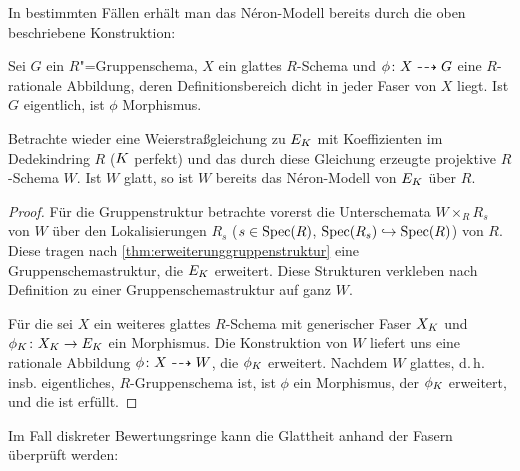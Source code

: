 \documentclass[german]{scrreprt}
\begin{document}
In bestimmten Fällen erhält man das Néron-Modell bereits durch die
oben beschriebene Konstruktion:
\begin{Lemma}\label{thm:rationalzumorphismus}
  Sei $G$ ein $R$"=Gruppenschema, $X$ ein glattes $R$-Schema und
  $\phi\colon X\dashrightarrow G$ eine $R$-rationale Abbildung, deren
  Definitionsbereich dicht in jeder Faser von $X$ liegt.
  Ist $G$ eigentlich, ist $\phi$ Morphismus.
  \cite[Proposition IV.6.2]{silverman2}
\end{Lemma}
\begin{Korollar}\label{thm:neronmausweierstrassgl}
  Betrachte wieder eine Weierstraßgleichung zu $E_{K}$ mit
  Koeffizienten im Dedekindring $R$ ($K$ perfekt) und das durch diese
  Gleichung erzeugte projektive $R$-Schema $W$.
  Ist $W$ glatt, so ist $W$ bereits das Néron-Modell von $E_{K}$ über
  $R$.
  \cite[Corollary IV.6.3]{silverman2}
  \begin{proof}
    Für die Gruppenstruktur betrachte vorerst die Unterschemata
    $W\times_R R_s$ von $W$ über den Lokalisierungen
    $R_s$ ($s\in\operatorname{Spec}(R)$, $\operatorname{Spec}(R_s)\hookrightarrow\operatorname{Spec}(R)$) von $R$.
    Diese tragen nach \autoref{thm:erweiterunggruppenstruktur} eine
    Gruppenschemastruktur, die $E_{K}$ erweitert.
    Diese Strukturen verkleben nach Definition zu einer
    Gruppenschemastruktur auf ganz $W$.

    Für die \NAbbEig sei $X$ ein weiteres glattes $R$-Schema mit
    generischer Faser $X_{K}$ und $\phi_{K}\colon X_{K}\to E_{K}$ ein
    Morphismus.
    Die Konstruktion von $W$ liefert uns eine rationale Abbildung
    $\phi\colon X\dashrightarrow W$, die $\phi_{K}$ erweitert.
    Nachdem $W$ glattes, d.\,h. insb. eigentliches, $R$-Gruppenschema
    ist, ist $\phi$ ein Morphismus, der $\phi_{K}$ erweitert, und die
    \NAbbEig ist erfüllt.
  \end{proof}
\end{Korollar}
Im Fall diskreter Bewertungsringe kann die Glattheit anhand der Fasern
überprüft werden:
\end{document}
